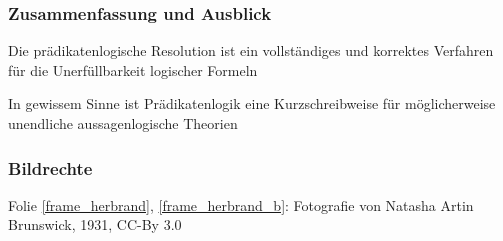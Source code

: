 \documentclass[aspectratio=1610,onlymath]{beamer}
\begin{document}
\begin{frame}\frametitle{Zusammenfassung und Ausblick}

Die prädikatenlogische Resolution ist ein vollständiges und korrektes Verfahren für die Unerfüllbarkeit logischer Formeln\bigskip

In gewissem Sinne ist Prädikatenlogik eine Kurzschreibweise für möglicherweise unendliche aussagenlogische Theorien
\bigskip




\end{frame}


\begin{frame}[t]\frametitle{Bildrechte}

Folie \ref{frame_herbrand}, \ref{frame_herbrand_b}: Fotografie von Natasha Artin Brunswick, 1931, CC-By 3.0

\end{frame}
\end{document}
